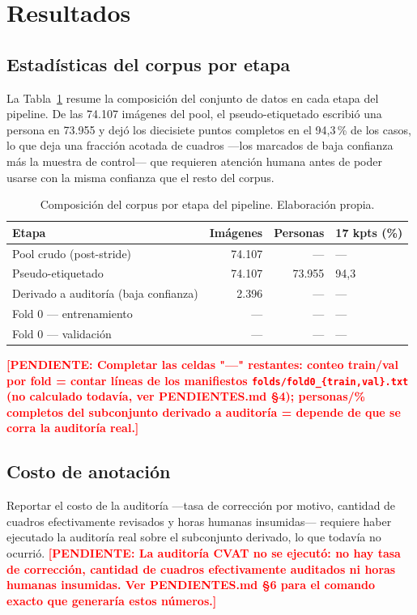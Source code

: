\documentclass[10pt,a4paper,twocolumn]{article}
\newcommand{\pendiente}[1]{\textcolor{red}{\textbf{[PENDIENTE: #1]}}}
\begin{document}
\section{Resultados}
\label{sec:resultados}

\subsection{Estadísticas del corpus por etapa}
La Tabla~\ref{tab:corpus} resume la composición del conjunto de datos en cada
etapa del pipeline. De las 74.107 imágenes del pool, el pseudo-etiquetado
escribió una persona en 73.955 y dejó los diecisiete puntos completos en el
94,3\,\% de los casos, lo que deja una fracción acotada de cuadros —los
marcados de baja confianza más la muestra de control— que requieren atención
humana antes de poder usarse con la misma confianza que el resto del corpus.

\begin{table}[t]
\caption{Composición del corpus por etapa del pipeline. Elaboración propia.}
\label{tab:corpus}
\centering
\fontsize{9}{11}\selectfont
\setlength{\tabcolsep}{4pt}
\begin{tabular}{@{}p{2.6cm}rrp{1.6cm}@{}}
\toprule
\textbf{Etapa} & \textbf{Imágenes} & \textbf{Personas} & \textbf{17 kpts (\%)} \\
\midrule
Pool crudo (post-stride) & 74.107 & --- & --- \\
Pseudo-etiquetado & 74.107 & 73.955 & 94,3 \\
Derivado a auditoría (baja confianza) & 2.396 & --- & --- \\
Fold 0 — entrenamiento & --- & --- & --- \\
Fold 0 — validación & --- & --- & --- \\
\bottomrule
\end{tabular}
\end{table}
\pendiente{Completar las celdas "---" restantes: conteo train/val por fold =
contar líneas de los manifiestos \texttt{folds/fold0\_\{train,val\}.txt} (no
calculado todavía, ver PENDIENTES.md \S4); personas/\% completos del
subconjunto derivado a auditoría = depende de que se corra la auditoría real.}

\subsection{Costo de anotación}
Reportar el costo de la auditoría —tasa de corrección por motivo, cantidad de
cuadros efectivamente revisados y horas humanas insumidas— requiere haber
ejecutado la auditoría real sobre el subconjunto derivado, lo que todavía no
ocurrió. \pendiente{La auditoría CVAT no se ejecutó: no hay tasa de
corrección, cantidad de cuadros efectivamente auditados ni horas humanas
insumidas. Ver PENDIENTES.md \S6 para el comando exacto que generaría estos
números.}
\end{document}
